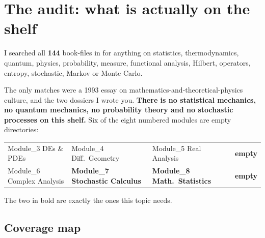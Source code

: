 \clearpage
\renewcommand{\sectioncolor}{shelf}
\section{The audit: what is actually on the shelf}

I searched all \textbf{144} book-files in  for anything
on statistics, thermodynamics, quantum, physics, probability, measure, functional analysis, Hilbert,
operators, entropy, stochastic, Markov or Monte Carlo.

\begin{missing}[title={The blunt finding}]
The only matches were a 1993 essay on mathematics-and-theoretical-physics culture, and the two
dossiers I wrote you. \textbf{There is no statistical mechanics, no quantum mechanics, no probability
theory and no stochastic processes on this shelf.} Six of the eight numbered modules are empty
directories:
\begin{center}\small
\begin{tabular}{@{}llll@{}}
\toprule
\rowcolor{alert!10}
Module\_3 DEs \& PDEs & Module\_4 Diff.\ Geometry & Module\_5 Real Analysis & \textbf{empty}\\
Module\_6 Complex Analysis & \textbf{Module\_7 Stochastic Calculus} & \textbf{Module\_8 Math.\ Statistics} & \textbf{empty}\\
\bottomrule
\end{tabular}
\end{center}
\vspace{2pt}
The two in bold are exactly the ones this topic needs.
\end{missing}

\subsection{Coverage map}

